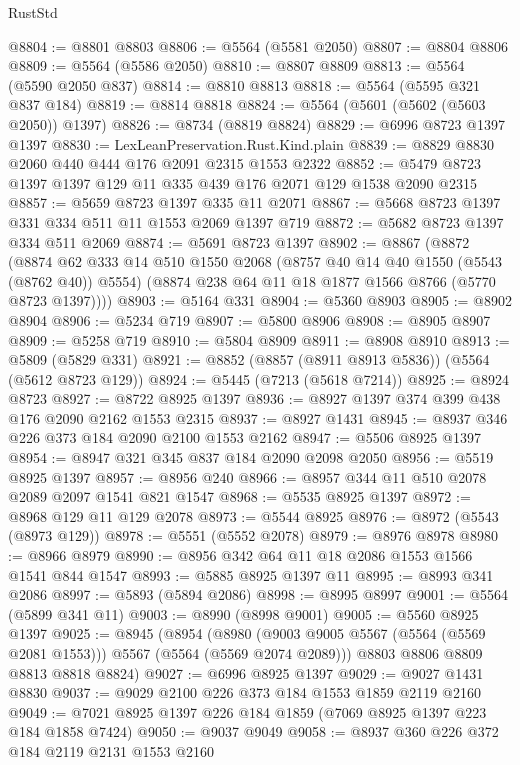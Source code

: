 \begin{lexlean}{RustStd}
\begin{coremodule}
@8804 := @8801 @8803
@8806 := @5564 (@5581 @2050)
@8807 := @8804 @8806
@8809 := @5564 (@5586 @2050)
@8810 := @8807 @8809
@8813 := @5564 (@5590 @2050 @837)
@8814 := @8810 @8813
@8818 := @5564 (@5595 @321 @837 @184)
@8819 := @8814 @8818
@8824 := @5564 (@5601 (@5602 (@5603 @2050)) @1397)
@8826 := @8734 (@8819 @8824)
@8829 := @6996 @8723 @1397 @1397
@8830 := LexLeanPreservation.Rust.Kind.plain
@8839 := @8829 @8830 @2060 @440 @444 @176 @2091 @2315 @1553 @2322
@8852 := @5479 @8723 @1397 @1397 @129 @11 @335 @439 @176 @2071 @129 @1538 @2090 @2315
@8857 := @5659 @8723 @1397 @335 @11 @2071
@8867 := @5668 @8723 @1397 @331 @334 @511 @11 @1553 @2069 @1397 @719
@8872 := @5682 @8723 @1397 @334 @511 @2069
@8874 := @5691 @8723 @1397
@8902 := @8867
    (@8872
      (@8874
        @62
        @333
        @14
        @510
        @1550
        @2068
        (@8757 @40 @14 @40 @1550 (@5543 (@8762 @40)) @5554)
        (@8874 @238 @64 @11 @18 @1877 @1566 @8766 (@5770 @8723 @1397))))
@8903 := @5164 @331
@8904 := @5360 @8903
@8905 := @8902 @8904
@8906 := @5234 @719
@8907 := @5800 @8906
@8908 := @8905 @8907
@8909 := @5258 @719
@8910 := @5804 @8909
@8911 := @8908 @8910
@8913 := @5809 (@5829 @331)
@8921 := @8852 (@8857 (@8911 @8913 @5836)) (@5564 (@5612 @8723 @129))
@8924 := @5445 (@7213 (@5618 @7214))
@8925 := @8924 @8723
@8927 := @8722 @8925 @1397
@8936 := @8927 @1397 @374 @399 @438 @176 @2090 @2162 @1553 @2315
@8937 := @8927 @1431
@8945 := @8937 @346 @226 @373 @184 @2090 @2100 @1553 @2162
@8947 := @5506 @8925 @1397
@8954 := @8947 @321 @345 @837 @184 @2090 @2098 @2050
@8956 := @5519 @8925 @1397
@8957 := @8956 @240
@8966 := @8957 @344 @11 @510 @2078 @2089 @2097 @1541 @821 @1547
@8968 := @5535 @8925 @1397
@8972 := @8968 @129 @11 @129 @2078
@8973 := @5544 @8925
@8976 := @8972 (@5543 (@8973 @129))
@8978 := @5551 (@5552 @2078)
@8979 := @8976 @8978
@8980 := @8966 @8979
@8990 := @8956 @342 @64 @11 @18 @2086 @1553 @1566 @1541 @844 @1547
@8993 := @5885 @8925 @1397 @11
@8995 := @8993 @341 @2086
@8997 := @5893 (@5894 @2086)
@8998 := @8995 @8997
@9001 := @5564 (@5899 @341 @11)
@9003 := @8990 (@8998 @9001)
@9005 := @5560 @8925 @1397
@9025 := @8945
    (@8954
      (@8980 (@9003 @9005 @5567 (@5564 (@5569 @2081 @1553))) @5567 (@5564 (@5569 @2074 @2089)))
      @8803
      @8806
      @8809
      @8813
      @8818
      @8824)
@9027 := @6996 @8925 @1397
@9029 := @9027 @1431 @8830
@9037 := @9029 @2100 @226 @373 @184 @1553 @1859 @2119 @2160
@9049 := @7021 @8925 @1397 @226 @184 @1859 (@7069 @8925 @1397 @223 @184 @1858 @7424)
@9050 := @9037 @9049
@9058 := @8937 @360 @226 @372 @184 @2119 @2131 @1553 @2160

\end{coremodule}
\end{lexlean}
